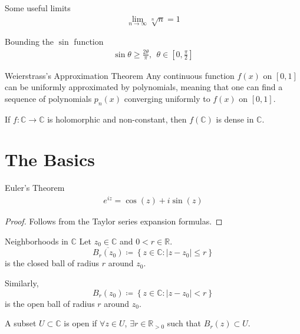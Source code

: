 \documentclass{article}
\begin{document}
    \begin{misc}{Some useful limits}{}
    \begin{align*}
        \lim_{n \to \infty} \sqrt[n]{n} = 1
    \end{align*}
    
    \end{misc}
    
    \begin{misc}{Bounding the \( \sin \) function}{}
    \begin{align*}
        \sin \theta \geq \frac{2\theta }{\pi }, \ \ \theta \in \left[ 0, \frac{\pi}{2} \right]  
    \end{align*}

    \end{misc}
    \begin{thrm}{Weierstrass's Approximation Theorem}{}
        Any continuous function \( f(x) \) on \( [0,1] \) can be uniformly approximated by polynomials, meaning that one can find a sequence of polynomials \( p_{n} (x) \) converging uniformly to \( f(x) \) on \( [0,1] \).
        \end{thrm}
        
        \begin{thrm}{}{}
        If \( f:\mathbb{C} \to \mathbb{C}  \) is holomorphic and non-constant, then \( f(\mathbb{C} ) \) is dense in \( \mathbb{C}  \). 
        \end{thrm}

\newpage


\section{The Basics}

\begin{thrm}{Euler's Theorem}{}
    \begin{align*}
        e^{iz} = \cos (z) + i\sin (z)  
    \end{align*}
    
    \begin{proof}
    Follows from the Taylor series expansion formulas.
    \end{proof}
    
    \end{thrm}

    \begin{exmp}{Neighborhoods in \( \mathbb{C}  \) }{}
        Let \( z_0 \in \mathbb{C}  \) and \( 0<r\in \mathbb{R}  \).
        \[
            \overline{B_{r} (z_0) }\coloneqq \left\{ z \in \mathbb{C} : |z - z_0| \leq  r \right\}  
        \]
        is the closed ball of radius \( r \) around \( z_0. \) 
        
        Similarly, 
        \[
            B_{r} (z_0) \coloneqq \left\{ z\in \mathbb{C} : |z - z_0| <r \right\} 
        \]
        is the open ball of radius \( r \) around \( z_0. \)
        
        A subset \( U \subset \mathbb{C}  \) is open if \( \forall z \in U \), \( \exists r  \in \mathbb{R}_{>0}  \)  such that \( B_{r} (z) \subset U  \). 
        \end{exmp}
        
\end{document}
